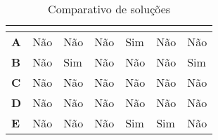 \documentclass[
	12pt,				%
	openright,			%
	oneside,			%
	a4paper,			%
	english,			%
	french,				%
	spanish,			%
	brazil,				%
	]{abntex2}
\begin{document}
 
\begin{table}[h!]
\centering
\caption{Comparativo de soluções}
\label{my-label}
\begin{tabular}{L|L|L|L|L|L|L}
\hline
\textbf{}	&       &       &       &       &       &       \\ \hline
\textbf{A}	& Não                                               & Não                                                                          & Não                                                 & Sim                                                             & Não                                                       & Não                                                                  \\ \hline
\textbf{B}	& Não                                               & Sim                                                                          & Não                                                 & Não                                                             & Não                                                       & Sim                                                                  \\ \hline
\textbf{C}	& Não                                               & Não                                                                          & Não                                                 & Não                                                             & Não                                                       & Não                                                                  \\ \hline
\textbf{D}	& Não                                               & Não                                                                          & Não                                                 & Não                                                             & Não                                                       & Não                                                                  \\ \hline
\textbf{E}	& Não                                               & Não                                                                          & Não                                                 & Sim                                                             & Sim                                                       & Não                                                                  \\ \hline

\end{tabular}
\end{table}
\end{document}
